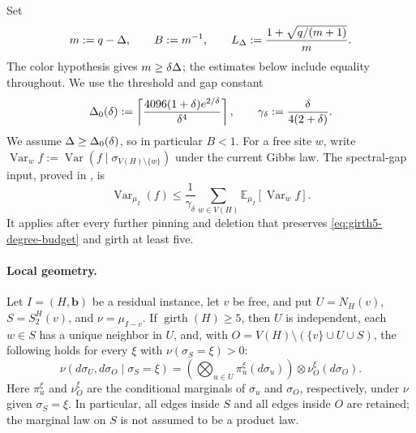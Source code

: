 Set
\begin{equation}\label{eq:girth5-basic-constants}
 m:=q-\Delta,\qquad B:=m^{-1},\qquad
 L_\Delta:=\frac{1+\sqrt{q/(m+1)}}{m}.
\end{equation}
The color hypothesis gives $m\ge\delta\Delta$; the estimates below include
equality throughout.
We use the threshold and gap constant
\begin{equation}\label{eq:girth5-gap-constants}
 \Delta_0(\delta):=\left\lceil
 \frac{4096(1+\delta)e^{2/\delta}}{\delta^4}\right\rceil,
 \qquad \gamma_\delta:=\frac{\delta}{4(2+\delta)}.
\end{equation}
We assume $\Delta\ge\Delta_0(\delta)$, so in particular $B<1$.
For a free site $w$, write
$\operatorname{Var}_w f:=\operatorname{Var}(f\mid
\sigma_{V(H)\setminus\{w\}})$ under the current Gibbs law.
The spectral-gap input, proved in , is
\begin{equation}\label{eq:girth5-poincare}
 \operatorname{Var}_{\mu_I}(f)
 \le\frac1{\gamma_\delta}\sum_{w\in V(H)}
       \mathbb E_{\mu_I}[\operatorname{Var}_w f].
\end{equation}
It applies after every further pinning and deletion that preserves
\eqref{eq:girth5-degree-budget} and girth at least five.

\paragraph{Local geometry.}

\begin{lemma}
\label{lem:girth5-disintegration}
Let $I=(H,\mathbf b)$ be a residual instance, let $v$ be free, and put
$U=N_H(v)$, $S=S_2^H(v)$, and $\nu=\mu_{I-v}$.  If $\operatorname{girth}(H)\ge5$, then $U$ is independent,
each $w\in S$ has a unique neighbor in $U$, and, with
$O=V(H)\setminus(\{v\}\cup U\cup S)$, the following holds for every
$\xi$ with $\nu(\sigma_S=\xi)>0$:
\begin{equation}\label{eq:girth5-disintegration}
 \nu(d\sigma_U,d\sigma_O\mid\sigma_S=\xi)
 =\left(\bigotimes_{u\in U}\pi_u^\xi(d\sigma_u)\right)
   \otimes\nu_O^\xi(d\sigma_O).
\end{equation}
Here $\pi_u^\xi$ and $\nu_O^\xi$ are the conditional marginals of
$\sigma_u$ and $\sigma_O$, respectively, under $\nu$ given $\sigma_S=\xi$.
In particular, all edges inside $S$ and all edges inside $O$ are retained;
the marginal law on $S$ is not assumed to be a product law.
\end{lemma}

